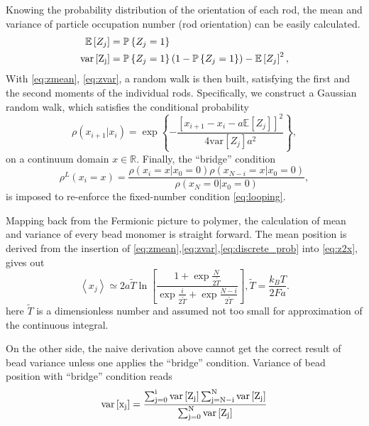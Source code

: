 \documentclass[aps,showpacs,twocolumn,floatfix,prx,superscriptaddress]{revtex4-1}
\begin{document}
Knowing the probability distribution of the orientation of each rod, the mean
and variance of particle occupation number (rod orientation) can be easily
calculated. 
\begin{subequations}
    \begin{align}
        \label{eq:zmean}
        \mathbb{E}\left[Z_j\right] & =  \mathbb{P} \left\{ Z_j = 1\right\} \\
        \label{eq:zvar}
        \rm{var}\left[Z_j\right] & = \mathbb{P} \left\{ Z_j = 1\right\} 
        \left( 1 - \mathbb{P} \left\{ Z_j = 1\right\} \right) -
        \mathbb{E}\left[Z_j\right]^2,
    \end{align}
\end{subequations}
With \eqref{eq:zmean}, \eqref{eq:zvar}, a random walk is then built, satisfying
the first and the second moments of the individual rods. Specifically, we
construct a Gaussian random walk, which satisfies the conditional probability
\begin{equation}
    \label{eq:xmean}
    \rho\left(x_{i+1} \vert x_i\right) =\exp\left\{ -\frac{\left[x_{i+1}- x_i -
                a\mathbb{E}\left[Z_j\right]\right]^2}{4
            \text{var}\left[Z_j\right]a^2}\right\}, 
\end{equation}
on a continuum domain $x \in \mathbb{R}$. Finally, the ``bridge'' condition
\begin{equation}
    \label{eq:bridge}
    \rho^L\left(x_i = x\right) = \frac{\rho\left(x_i = x \vert x_0 = 0\right)
        \rho\left(x_{N-i} = x \vert x_0 = 0\right)}{\rho\left(x_N = 0 \vert x_0
            = 0\right)},
\end{equation}
is imposed to re-enforce the fixed-number condition \eqref{eq:looping}. 

Mapping back from the Fermionic picture to polymer, the calculation of mean and
variance of every bead monomer is straight forward.  The mean position is
derived from the insertion of
\eqref{eq:zmean},\eqref{eq:zvar},\eqref{eq:discrete_prob} into \eqref{eq:z2x},
gives out
\begin{equation}
    \label{eq:xvar}
    \left<x_j\right> \simeq 2a\tilde{T} \ln{ \left[
            \frac{1+\exp{\frac{N}{2\tilde{T}}}}
            {\exp{\frac{i}{2\tilde{T}}}+\exp{\frac{N-i}{2\tilde{T}}}}\right]}, 
    \tilde{T} = \frac{k_B T}{2Fa}.
\end{equation}
here $\tilde T$ is a dimensionless number and assumed not too small for
approximation of the continuous integral.

On the other side, the naive derivation above cannot get the correct result of bead
variance unless one applies the ``bridge'' condition. Variance of bead position
with ``bridge'' condition reads
\begin{equation}
    \rm{var}\left[x_j\right] =
    \frac{\sum_{j=0}^i\rm{var}\left[Z_j\right]\sum_{j=N-i}^N\rm{var}\left[Z_j\right]}{\sum_{j=0}^N\rm{var}\left[Z_j\right]}
\end{equation}
\end{document}
